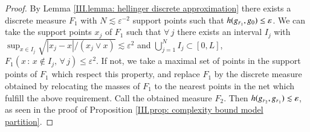 \begin{proof}
By Lemma \ref{III.lemma: hellinger discrete approximation} there exists a discrete measure $F_1$ with $N \lesssim \varepsilon^{-2} $ support points such that $h(g_{\scriptscriptstyle{F_{\scaleto{1}{3.2pt}}}}, g_0) \leq \varepsilon$. We can take the support points $x_j$ of $F_1$ such that $\forall \, j$ there exists an interval $I_j$ with $\sup_{x\in I_j} \sqrt{|x_j-x|/ (x_j \vee x)} \lesssim \varepsilon^2$ and $\bigcup_{j=1}^N I_j \subset [0,L]$, $F_1 (x \, : \, x \notin I_j, \, \forall \, j) \leq \varepsilon^2$. If not, we take a maximal set of points in the support points of $F_1$ which respect this property, and replace $F_1$ by the discrete measure obtained by relocating the masses of $F_1$ to the nearest points in the net which fulfill the above requirement. Call the obtained measure $F_2$. Then $h(g_{\scriptscriptstyle{F_{\scaleto{2}{3.2pt}}}}, g_{\scriptscriptstyle{F_{\scaleto{1}{3.2pt}}}}) \lesssim \varepsilon$, as seen in the proof of Proposition \ref{III.prop: complexity bound model partition}. 


\end{proof}
